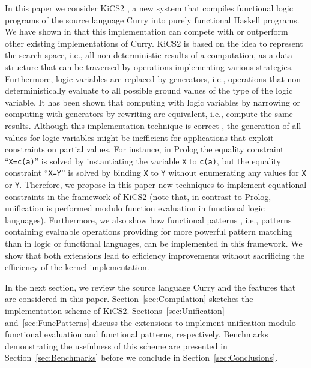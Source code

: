 \documentclass{llncs}
\newcommand{\code}[1]{\mbox{\small\texttt{#1}}}
\newcommand{\ccode}[1]{``\code{#1}''}
\begin{document}
In this paper we consider KiCS2 \cite{BrasselFischerHanusReck11},
a new system that compiles functional logic programs of the
source language Curry \cite{Hanus06Curry}
into purely functional Haskell programs.
We have shown in \cite{BrasselFischerHanusReck11}
that this implementation can compete with or outperform
other existing implementations of Curry.
KiCS2 is based on the idea to represent
the search space, i.e., all non-deterministic results of a computation,
as a data structure that can be traversed by operations
implementing various strategies.
Furthermore, logic variables are replaced by generators,
i.e., operations that non-deterministically evaluate to
all possible ground values of the type of the logic variable.
It has been shown \cite{AntoyHanus06ICLP}
that computing with logic variables by narrowing \cite{Reddy85,Slagle74}
or computing with generators by rewriting
are equivalent, i.e., compute the same results.
Although this implementation technique is correct \cite{Brassel11Thesis},
the generation of all values for logic variables
might be inefficient for applications that
exploit constraints on partial values.
For instance, in Prolog the equality constraint \ccode{X=c(a)}
is solved by instantiating the variable \code{X} to \code{c(a)},
but the equality constraint \ccode{X=Y} is solved by binding \code{X}
to \code{Y} without enumerating any values for \code{X} or \code{Y}.
Therefore, we propose in this paper new techniques
to implement equational constraints in the framework of KiCS2
(note that, in contrast to Prolog, unification is performed
modulo function evaluation in functional logic languages).
Furthermore, we also show how functional patterns \cite{AntoyHanus05LOPSTR},
i.e., patterns containing evaluable operations providing
for more powerful pattern matching than in logic or functional languages,
can be implemented in this framework.
We show that both extensions lead to efficiency improvements
without sacrificing the efficiency of the kernel implementation.

In the next section, we review the source language Curry
and the features that are considered in this paper.
Section~\ref{sec:Compilation} sketches the implementation scheme
of KiCS2.
Sections~\ref{sec:Unification} and~\ref{sec:FuncPatterns}
discuss the extensions to implement unification modulo
functional evaluation and functional patterns, respectively.
Benchmarks demonstrating the usefulness of this scheme
are presented in Section~\ref{sec:Benchmarks}
before we conclude in Section~\ref{sec:Conclusions}.
\end{document}
